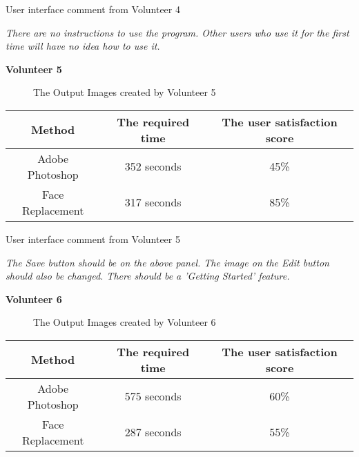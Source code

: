 \vspace{0.2in}\noindent User interface comment from Volunteer 4

\emph{There are no instructions to use the program. Other users who use it for the first time will have no idea how to use it.}

\vspace{2.5in}\noindent \textbf{Volunteer 5}
\begin{figure}[htb]
  \centering
  \caption{The Output Images created by Volunteer 5}
  \label{fig:Result5}
\end{figure}

\begin{center}
\begin{tabular}{|c|c|c|}
  \hline
  Method & The required time & The user satisfaction score \\ \hline
  Adobe Photoshop & 352 seconds & 45\% \\ \hline
  Face Replacement & 317 seconds & 85\% \\
  \hline
\end{tabular}
\end{center}

\vspace{0.2in}\noindent User interface comment from Volunteer 5

\emph{The Save button should be on the above panel. The image on the Edit button should also be changed. There should be a 'Getting Started' feature.}

\vspace{0.2in}\noindent \textbf{Volunteer 6}
\begin{figure}[htb]
  \centering
  \caption{The Output Images created by Volunteer 6}
  \label{fig:Result6}
\end{figure}

\vspace{1.0in}
\begin{center}
\begin{tabular}{|c|c|c|}
  \hline
  Method & The required time & The user satisfaction score \\ \hline
  Adobe Photoshop & 575 seconds & 60\% \\ \hline
  Face Replacement & 287 seconds & 55\% \\
  \hline
\end{tabular}
\end{center}

